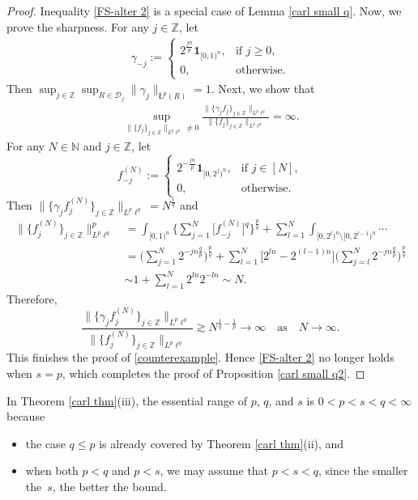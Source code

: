 \documentclass[11pt, reqno]{amsart}
\theoremstyle{definition}
\theoremstyle{remark}
\numberwithin{equation}{section}
\newcommand{\D}{\mathscr D}
\newcommand{\Z}{\mathbb Z}
\newcommand{\one}{\mathbf{1}}
\newcommand{\aveL}{\textit{\L}}
\newcommand{\Norm}[2]{\|#1\|_{#2}}
\begin{document}
\begin{proof}
Inequality \eqref{FS-alter 2} is a special case of Lemma \ref{carl small q}.
Now, we prove the sharpness.
For any $j\in\mathbb Z$, let
\begin{align}\label{counterexample2}
\gamma_{-j}:=\begin{cases}
2^{\frac{jn}{p}}\mathbf 1_{[0,1)^n},&
\text{if } j\geq 0,\\
0,&\text{otherwise}.
\end{cases}
\end{align}
Then
$\sup_{j\in\Z}\sup_{R\in\D_j}
\Norm{\gamma_j}{\aveL^p(R)}=1$.
Next, we show that
\begin{align}\label{counterexample}
\sup_{\|\{ f_j\}_{j\in\mathbb Z}\|_{L^p\ell^q}\ne 0}
\frac{\|\{\gamma_jf_j\}_{j\in\mathbb Z}\|_{L^p\ell^q}}
{\|\{ f_j\}_{j\in\mathbb Z}\|_{L^p\ell^q}}
=\infty.
\end{align}
For any $N\in\mathbb N$ and $j\in\mathbb Z$, let
$$
f_{-j}^{(N)}:=\begin{cases}
2^{-\frac{jn}{p}}\one_{[0,2^{j})^n},&
\text{if } j\in[N],\\
0,&\text{otherwise}.
\end{cases}
$$
Then $\|\{\gamma_jf_j^{(N)}\}_{j\in\mathbb Z}\|_{L^p\ell^q}=N^{\frac1q}$ and
\begin{align*}
\Big\|\Big\{ f_j^{(N)}\Big\}_{j\in\mathbb Z}\Big\|_{L^p\ell^q}^p
&= \int_{[0,1)^n} \Bigg\{\sum_{j=1}^{N}\Big[f_{-j}^{(N)}\Big]^q\Bigg\}^{\frac pq}
+\sum_{l=1}^{N}\int_{[0,2^{l})^n\setminus[0,2^{l-1})^n} \cdots\\
&=\Bigg(\sum_{j=1}^{N}2^{-jn\frac qp}\Bigg)^{\frac pq}
+\sum_{l=1}^{N} \Big[2^{ln}-2^{(l-1)n}\Big]
\Bigg(\sum_{j=l}^N 2^{-jn\frac qp}\Bigg)^{\frac pq}\\
&\sim 1+\sum_{l=1}^{N} 2^{ln}2^{-ln}\sim N.
\end{align*}
Therefore,
$$
\frac{\|\{\gamma_jf_j^{(N)}\}_{j\in\mathbb Z}\|_{L^p\ell^q}}
{\|\{ f_j^{(N)}\}_{j\in\mathbb Z}\|_{L^p\ell^q}}
\gtrsim N^{\frac1q-\frac1p}\to\infty
\quad\text{as}\quad N\to\infty.
$$
This finishes the proof of \eqref{counterexample}.
Hence \eqref{FS-alter 2} no longer holds when $s = p$,
which completes the proof of Proposition \ref{carl small q2}.
\end{proof}

In Theorem \ref{carl thm}(iii), the essential range of $p$, $q$, and $s$
is $0<p<s<q<\infty$ because
\begin{itemize}
  \item the case $q\leq p$ is already covered by Theorem \ref{carl thm}(ii), and
  \item when both $p<q$ and $p<s$, we may assume that $p<s<q$, since the smaller the~$s$, the better the bound.
\end{itemize}
\end{document}
